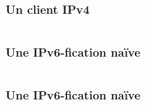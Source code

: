 \begin{frame}[fragile]{}
	\frametitle{Un client IPv4}
    \begin{minipage}{0.5\textwidth}
      \inputminted[mathescape,
        linenos,
        fontsize=\scriptsize,
        framesep=2mm]{python}{../echo_client_v4.py}
    \end{minipage}
	
\end{frame}

\begin{frame}[fragile]{}
	\frametitle{Une IPv6-fication naïve}
    \begin{minipage}{0.5\textwidth}
      \inputminted[mathescape,
        fontsize=\scriptsize,
        framesep=2mm]{diff}{../echo_client_v4_v6.diff}
    \end{minipage}
\end{frame}


\begin{frame}[fragile]{}
	\frametitle{Une IPv6-fication naïve}
    \begin{minipage}{0.5\textwidth}
      \inputminted[mathescape,
        linenos,
        fontsize=\scriptsize,
        framesep=2mm]{python}{../echo_client_v6_naif.py}
    \end{minipage}
\end{frame}



